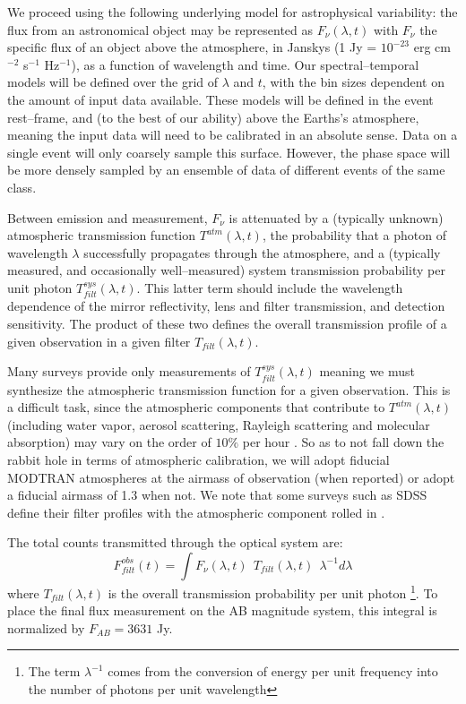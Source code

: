 \smallskip

We proceed using the following underlying model for astrophysical variability:
the flux from an astronomical object may be represented as $F_\nu(\lambda, t)$
with $F_\nu$ the specific flux of an object above the atmosphere, in Janskys (1
Jy = $10^{-23}$ erg cm$^{-2}$ s$^{-1}$ Hz$^{-1}$), as a function of wavelength
and time.  Our spectral--temporal models will be defined over the grid of
$\lambda$ and $t$, with the bin sizes dependent on the amount of input data
available.  These models will be defined in the event rest--frame, and (to the
best of our ability) above the Earths's atmosphere, meaning the input data will
need to be calibrated in an absolute sense. Data on a single event will only
coarsely sample this surface.  However, the phase space will be more densely
sampled by an ensemble of data of different events of the same class.

Between emission and measurement, $F_\nu$ is attenuated by a (typically unknown)
atmospheric transmission function $T^{atm}(\lambda, t)$, the probability that a
photon of wavelength $\lambda$ successfully propagates through the atmosphere,
and a (typically measured, and occasionally well--measured) system transmission
probability per unit photon $T^{sys}_{filt}(\lambda, t)$.  This latter term
should include the wavelength dependence of the mirror reflectivity, lens and
filter transmission, and detection sensitivity.  The product of these two
defines the overall transmission profile of a given observation in a given
filter $T_{filt}(\lambda, t)$.

Many surveys provide only measurements of $T^{sys}_{filt}(\lambda, t)$
\citep[e.g.][]{2006ApJ...646.1436S} meaning we must synthesize the atmospheric
transmission function for a given observation.  This is a difficult task, since
the atmospheric components that contribute to $T^{atm}(\lambda, t)$ (including
water vapor, aerosol scattering, Rayleigh scattering and molecular absorption)
may vary on the order of $10\%$ per hour \citep{2007PASP..119.1163S}.  So as to
not fall down the rabbit hole in terms of atmospheric calibration, we will adopt
fiducial MODTRAN atmospheres \citep{1999SPIE.3756..348B} at the airmass of
observation (when reported) or adopt a fiducial airmass of 1.3 when not.  We
note that some surveys such as SDSS define their filter profiles with the
atmospheric component rolled in \citep{2007AJ....134..973I}.

The total counts transmitted through the optical system are: $$F^{obs}_{filt}
(t) = \int F_\nu(\lambda, t) ~~ T_{filt} (\lambda, t) ~~ \lambda^{-1} d\lambda$$
where $T_{filt}(\lambda, t)$ is the overall transmission probability per unit
photon \footnote{The term $\lambda^{-1}$ comes from the conversion of energy per
unit frequency into the number of photons per unit wavelength}. To place the
final flux measurement on the AB magnitude system, this integral is normalized
by $F_{AB} = 3631$ Jy.


